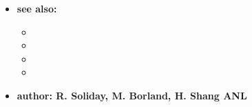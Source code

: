 \begin{itemize}
\item {\bf see also:}
    \begin{itemize}
%
%
    \item {}
    \item {}
    \item {}
    \item {}
    \end{itemize}
%
%
\item {\bf author: R. Soliday, M. Borland, H. Shang ANL} 
\end{itemize}
